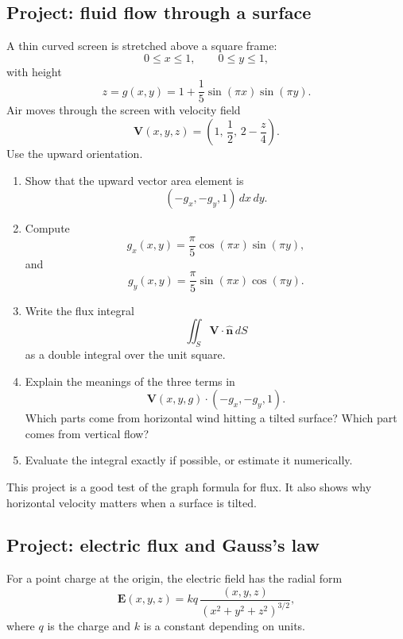 \subsection{Project: fluid flow through a surface}

A thin curved screen is stretched above a square frame:
\[
    0\le x\le1,
    \qquad
    0\le y\le1,
\]
with height
\[
    z=g(x,y)=1+\frac15\sin(\pi x)\sin(\pi y).
\]
Air moves through the screen with velocity field
\[
    \mathbf V(x,y,z)=
    \left(
    1,\,
    \frac12,\,
    2-\frac z4
    \right).
\]
Use the upward orientation.

\begin{enumerate}
\item Show that the upward vector area element is
\[
    (-g_x,-g_y,1)\,dx\,dy.
\]

\item Compute
\[
    g_x(x,y)
    =
    \frac{\pi}{5}\cos(\pi x)\sin(\pi y),
\]
and
\[
    g_y(x,y)
    =
    \frac{\pi}{5}\sin(\pi x)\cos(\pi y).
\]

\item Write the flux integral
\[
    \iint_S\mathbf V\cdot\widehat{\mathbf n}\,dS
\]
as a double integral over the unit square.

\item Explain the meanings of the three terms in
\[
    \mathbf V(x,y,g)\cdot(-g_x,-g_y,1).
\]
Which parts come from horizontal wind hitting a tilted surface?  Which part comes from
vertical flow?

\item Evaluate the integral exactly if possible, or estimate it numerically.
\end{enumerate}

This project is a good test of the graph formula for flux.  It also shows why horizontal
velocity matters when a surface is tilted.

\subsection{Project: electric flux and Gauss's law}

For a point charge at the origin, the electric field has the radial form
\[
    \mathbf E(x,y,z)
    =
    kq\,\frac{(x,y,z)}{(x^2+y^2+z^2)^{3/2}},
\]
where \(q\) is the charge and \(k\) is a constant depending on units.

